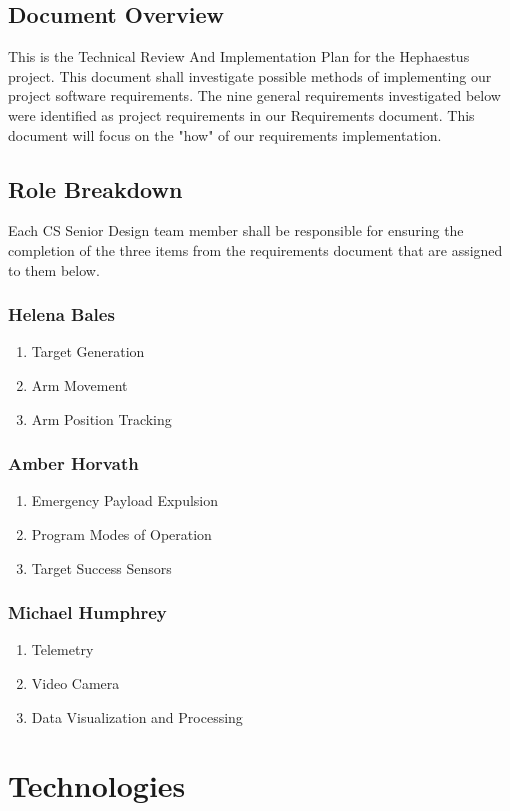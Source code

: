 \documentclass[letterpaper,10pt]{article}
\begin{document}
\subsection{Document Overview}
This is the Technical Review And Implementation Plan for the Hephaestus project.
This document shall investigate possible methods of implementing our project software requirements.
The nine general requirements investigated below were identified as project requirements in our Requirements document.
This document will focus on the "how" of our requirements implementation.
\subsection{Role Breakdown}
Each CS Senior Design team member shall be responsible for ensuring the completion of the three items
from the requirements document that are assigned to them below.
\subsubsection{Helena Bales}
\begin{enumerate}
\item{Target Generation}
\item{Arm Movement}
\item{Arm Position Tracking}
\end{enumerate}
\subsubsection{Amber Horvath}
\begin{enumerate}
\item{Emergency Payload Expulsion}
\item{Program Modes of Operation}
\item{Target Success Sensors}
\end{enumerate}
\subsubsection{Michael Humphrey}
\begin{enumerate}
\item{Telemetry}
\item{Video Camera}
\item{Data Visualization and Processing}
\end{enumerate}

\section{Technologies}
\end{document}
